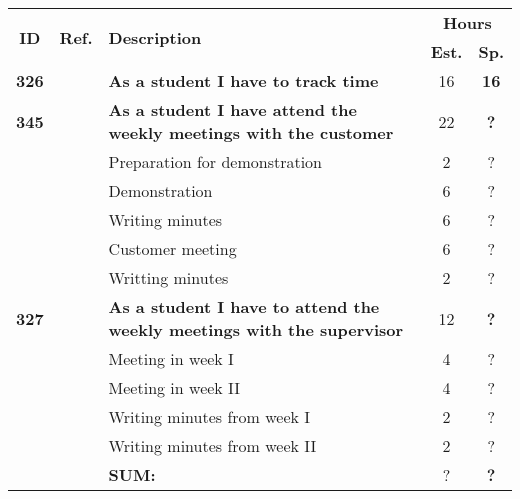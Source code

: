 \label{tab:sprint3storiesProcess}
\def\arraystretch{1.25}
 
\begin{longtable}{ccXcc}

\toprule[0.5mm]
\multirow{2}{*}{\textbf{ID}} &
\multirow{2}{*}{\textbf{Ref.}} & \multirow{2}{*}{\textbf{Description}} & \multicolumn{2}{c}{\textbf{Hours}} \\
 					& & & \textbf{Est.} & \textbf{Sp.} \\
\midrule
\textbf{326} 	& 
	& {\bf  As a student I have to track time} 	& 		16	& \textbf{16} \\
\textbf{345} 	& 
	& {\bf As a student I have attend the weekly meetings with the customer} 	
	& 	22	
	& \textbf{?} \\
		&& Preparation for demonstration	& 2 & ? \\
		&& Demonstration	&  6 & ? \\
		&& Writing minutes 	&  6 & ? \\	
		&& Customer meeting	&  6 & ? \\
		&& Writting minutes	&  2 & ? \\
		
\textbf{327} 	& 
	& {\bf As a student I have to attend the weekly meetings with the supervisor} 	
	& 	12	
	& \textbf{?} \\
		&& Meeting in week I	& 4 & ? \\
		&& Meeting in week II	& 4 & ? \\
		&& Writing minutes from week I 	&  2 & ? \\
		&& Writing minutes from week II	&  2 & ? \\					
\hline
				&& \textbf{SUM:}		&		?	& \textbf{?}
 \\																			
\bottomrule[0.5mm]
\end{longtable}
